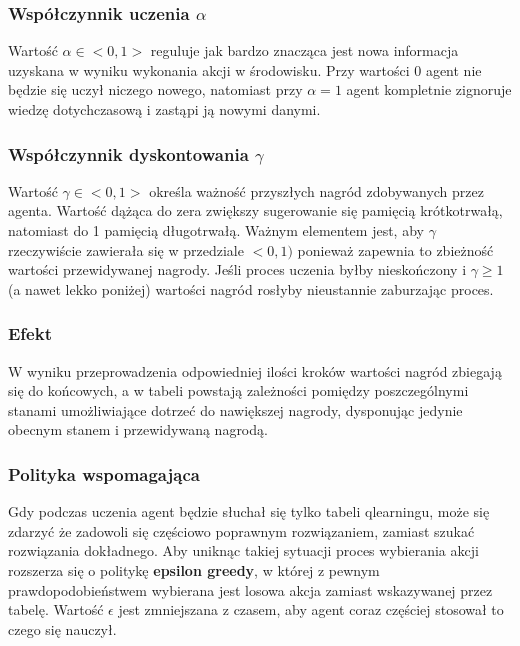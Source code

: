 \documentclass{article}
\begin{document}
\subsubsection{Współczynnik uczenia \(\alpha\)}
Wartość \(\alpha \in <0, 1>\) reguluje jak bardzo znacząca jest nowa informacja uzyskana w wyniku wykonania akcji w środowisku. Przy wartości 0 agent nie będzie się uczył niczego nowego, natomiast przy \(\alpha = 1\) agent kompletnie zignoruje wiedzę dotychczasową i zastąpi ją nowymi danymi. 
\subsubsection{Współczynnik dyskontowania \(\gamma\)}
Wartość \(\gamma \in <0, 1>\) określa ważność przyszłych nagród zdobywanych przez agenta. Wartość dążąca do zera zwiększy sugerowanie się pamięcią krótkotrwałą, natomiast do 1 pamięcią długotrwałą. Ważnym elementem jest, aby \(\gamma\) rzeczywiście zawierała się w przedziale \(<0, 1)\) ponieważ zapewnia to zbieżność wartości przewidywanej nagrody. Jeśli proces uczenia byłby nieskończony i \(\gamma \ge 1\) (a nawet lekko poniżej) wartości nagród rosłyby nieustannie zaburzając proces.
\subsubsection{Efekt}
W wyniku przeprowadzenia odpowiedniej ilości kroków wartości nagród zbiegają się do końcowych, a w tabeli powstają zależności pomiędzy poszczególnymi stanami umożliwiające dotrzeć do nawiększej nagrody, dysponując jedynie obecnym stanem i przewidywaną nagrodą.
\subsubsection{Polityka wspomagająca}
Gdy podczas uczenia agent będzie słuchał się tylko tabeli qlearningu, może się zdarzyć że zadowoli się częściowo poprawnym rozwiązaniem, zamiast szukać rozwiązania dokładnego. Aby uniknąc takiej sytuacji proces wybierania akcji rozszerza się o politykę \textbf{epsilon greedy}, w której z pewnym prawdopodobieństwem wybierana jest losowa akcja zamiast wskazywanej przez tabelę. Wartość \(\epsilon\) jest zmniejszana z czasem, aby agent coraz częściej stosował to czego się nauczył.
\end{document}
